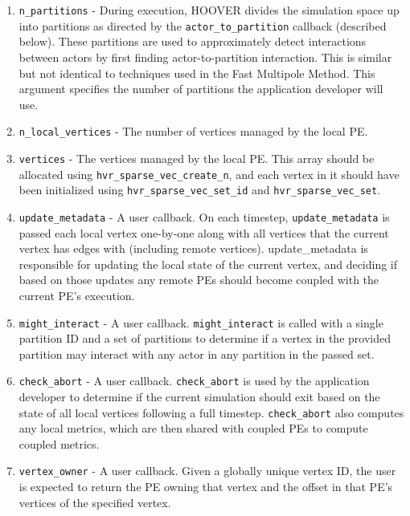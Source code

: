 \begin{enumerate}
    \item \texttt{n\_partitions} - During execution, HOOVER divides the
        simulation space up into partitions as directed by the
        \texttt{actor\_to\_partition} callback (described below). These
        partitions are used to approximately detect interactions between actors
        by first finding actor-to-partition interaction. This is similar but not
        identical to techniques used in the Fast Multipole Method. This argument
        specifies the number of partitions the application developer will use.
    \item \texttt{n\_local\_vertices} - The number of vertices managed by the
        local PE.
    \item \texttt{vertices} - The vertices managed by the local PE. This array
        should be allocated using \texttt{hvr\_sparse\_vec\_create\_n}, and each
        vertex in it should have been initialized using
        \texttt{hvr\_sparse\_vec\_set\_id} and \texttt{hvr\_sparse\_vec\_set}.
    \item \texttt{update\_metadata} - A user callback. On each timestep,
        \texttt{update\_metadata} is passed each local vertex one-by-one along
        with all vertices that the current vertex has edges with (including
        remote vertices). update\_metadata is responsible for updating the local
        state of the current vertex, and deciding if based on those updates any
        remote PEs should become coupled with the current PE's execution.
    \item \texttt{might\_interact} - A user callback. \texttt{might\_interact}
        is called with a single partition ID and a set of partitions to
        determine if a vertex in the provided partition may interact with any
        actor in any partition in the passed set.
    \item \texttt{check\_abort} - A user callback. \texttt{check\_abort}
        is used by the application developer to determine if the current
        simulation should exit based on the state of all local vertices
        following a full timestep. \texttt{check\_abort} also computes any
        local metrics, which are then shared with coupled PEs to compute coupled
        metrics.
    \item \texttt{vertex\_owner} - A user callback. Given a globally unique
        vertex ID, the user is expected to return the PE owning that vertex and
        the offset in that PE's vertices of the specified vertex.

\end{enumerate}
